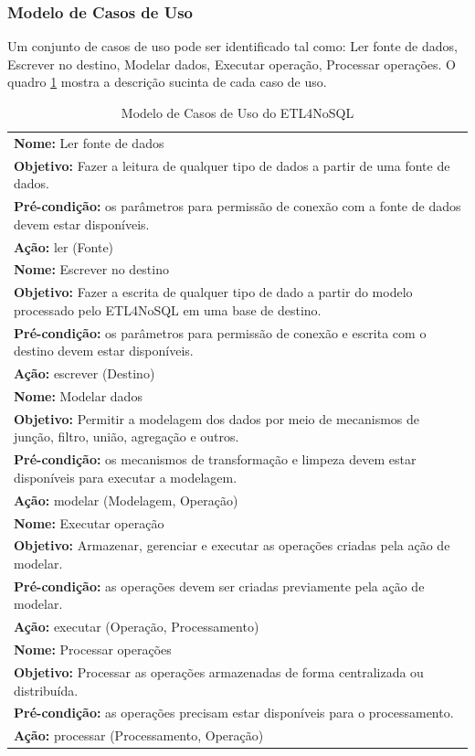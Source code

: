 \subsubsection{Modelo de Casos de Uso}

Um conjunto de casos de uso pode ser identificado tal como: Ler fonte de dados, Escrever no destino, Modelar dados, Executar operação, Processar operações. O quadro \ref{casosdeuso} mostra a descrição sucinta de cada caso de uso.

\clearpage

\begin{table}[h]
	\centering
	\caption{Modelo de Casos de Uso do ETL4NoSQL}
	\label{casosdeuso}
	\begin{tabular}{|p{14cm}|}
		\hline
			\textbf{Nome:} Ler fonte de dados\\ 
			\textbf{Objetivo:} Fazer a leitura de qualquer tipo de dados a partir de uma fonte de dados.\\ 
			\textbf{Pré-condição:} os parâmetros para permissão de conexão com a fonte de dados devem estar disponíveis.\\ 
			\textbf{Ação:} ler (Fonte)\\ 
		\hline
			\textbf{Nome:} Escrever no destino\\ 
			\textbf{Objetivo:} Fazer a escrita de qualquer tipo de dado a partir do modelo processado pelo ETL4NoSQL em uma base de destino.\\ 
			\textbf{Pré-condição:} os parâmetros para permissão de conexão e escrita com o destino devem estar disponíveis.\\ 
			\textbf{Ação:} escrever (Destino)  \\ 
	\hline
			\textbf{Nome:} Modelar dados\\ 
			\textbf{Objetivo:} Permitir a modelagem dos dados por meio de mecanismos de junção, filtro, união, agregação e outros. \\
			 \textbf{Pré-condição:} os mecanismos de transformação e limpeza devem estar disponíveis para executar a modelagem.\\ 
			 \textbf{Ação:} modelar (Modelagem, Operação)\\ 
	 \hline
	 		\textbf{Nome:} Executar operação\\ 
	 		\textbf{Objetivo:} Armazenar, gerenciar e executar as operações criadas pela ação de modelar.\\
	 		\textbf{Pré-condição:} as operações devem ser criadas previamente pela ação de modelar.\\ 
	 		\textbf{Ação:} executar (Operação, Processamento)\\ 
	 \hline
	 	\textbf{Nome:} Processar operações\\ 
	 	\textbf{Objetivo:} Processar as operações armazenadas de forma centralizada ou distribuída.\\
	 	\textbf{Pré-condição:} as operações precisam estar disponíveis para o processamento.\\ 
	 	\textbf{Ação:} processar (Processamento, Operação)\\ 
	 \hline
	 
	\end{tabular}
\end{table}

